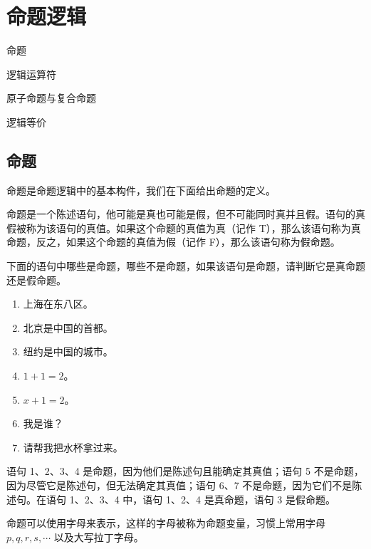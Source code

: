 \section{命题逻辑}
\begin{introduction}
    \item 命题
    \item 逻辑运算符
    \item 原子命题与复合命题
    \item 逻辑等价
\end{introduction}

\subsection{命题}
命题是命题逻辑中的基本构件，我们在下面给出命题的定义。
\begin{definition}[命题的定义]\label{def:命题的定义}
    命题是一个陈述语句，他可能是真也可能是假，但不可能同时真并且假。语句的真假被称为该语句的真值。如果这个命题的真值为真（记作 T），那么该语句称为真命题，反之，如果这个命题的真值为假（记作 F），那么该语句称为假命题。
\end{definition}

\begin{collections}
    \begin{example}
        下面的语句中哪些是命题，哪些不是命题，如果该语句是命题，请判断它是真命题还是假命题。
        \begin{enumerate}
            \item 上海在东八区。
            \item 北京是中国的首都。
            \item 纽约是中国的城市。
            \item $1 + 1 = 2$。
            \item $x + 1 = 2$。
            \item 我是谁？
            \item 请帮我把水杯拿过来。
        \end{enumerate}
    \end{example}
    \begin{solution}
        语句 1、2、3、4 是命题，因为他们是陈述句且能确定其真值；语句 5 不是命题，因为尽管它是陈述句，但无法确定其真值；语句 6、7 不是命题，因为它们不是陈述句。在语句 1、2、3、4 中，语句 1、2、4 是真命题，语句 3 是假命题。
    \end{solution}
\end{collections}

命题可以使用字母来表示，这样的字母被称为命题变量，习惯上常用字母 $p, q, r, s, \cdots$ 以及大写拉丁字母。


